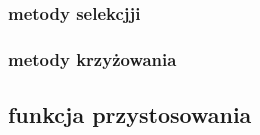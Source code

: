 \documentclass{article}
\begin{document}
\subsubsection{metody selekcjji}







\subsubsection{metody krzyżowania}




\subsection{funkcja przystosowania}








\end{document}
